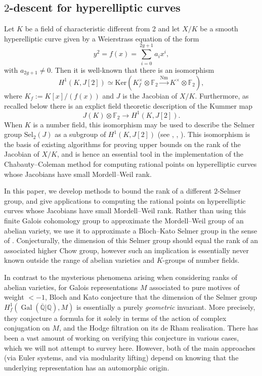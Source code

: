 \documentclass[11pt]{amsart}
\def\Q{\mathbb Q}
\def\F{\mathbb F}
\theoremstyle{plain}
\theoremstyle{definition}
\DeclareMathOperator{\Gal}{Gal}
\newcommand{\Sel}{\mathrm{Sel}}
\newcommand{\Nm}{\mathrm{Nm}}
\newcommand{\Ker}{\mathrm{Ker}}
\begin{document}
\subsection{$2$-descent for hyperelliptic curves}
Let $K$ be a field of characteristic different from 2 and let $X/K$ be a smooth hyperelliptic curve given by a Weierstrass equation of the form
\[
y^2 =f(x)=\sum _{i=0}^{2g+1}a_i x^i ,
\]
with $a_{2g+1}\neq 0$. Then it is well-known that there is an isomorphism
\[
H^1 (K,J[2]) \simeq \Ker (K_f ^\times \otimes \mathbb{F}_2 \stackrel{\Nm }{\longrightarrow }K^\times \otimes \mathbb{F}_2 ),
\] 
where $K_f :=K[x]/(f(x))$ and $J$ is the Jacobian of $X/K$. Furthermore, as recalled below there is an explict field theoretic description of the Kummer map
\[
J(K)\otimes \F _2 \to H^1 (K,J[2]).
\]
When $K$ is a number field, this isomorphism may be used to describe the Selmer group $\Sel _2 (J)$ as a subgroup of $H^1 (K,J[2])$ (see \cite{schaefer}, \cite{PS97}, \cite{stoll:implementing}). This isomorphism is the basis of existing algorithms for proving upper bounds on the rank of the Jacobian of $X/K$, and is hence an essential tool in the implementation of the Chabauty--Coleman method for computing rational points on hyperelliptic curves whose Jacobians have small Mordell--Weil rank. 

In this paper, we develop methods to bound the rank of a different $2$-Selmer group, and give applications to computing the rational points on hyperelliptic curves whose Jacobians have small Mordell--Weil rank. Rather than using this finite Galois cohomology group to approximate the Mordell--Weil group of an abelian variety, we use it to approximate a Bloch--Kato Selmer group in the sense of \cite{BK}. Conjecturally, the dimension of this Selmer group should equal the rank of an associated higher Chow group, however such an implication is essentially never known outside the range of abelian varieties and $K$-groups of number fields.

In contrast to the mysterious phenomena arising when considering ranks of abelian varieties, for Galois representations $M$ associated to pure motives of weight $<-1$, Bloch and Kato conjecture that the dimension of the Selmer group $H^1 _f (\Gal (\overline{\Q }|\Q ),M)$ is essentially a purely \textit{geometric} invariant. More precisely, they conjecture a formula for it solely in terms of the action of complex conjugation on $M$, and the Hodge filtration on its de Rham realisation. There has been a vast amount of working on verifying this conjecture in various cases, which we will not attempt to survey here. However, both of the main approaches (via Euler systems, and via modularity lifting) depend on knowing that the underlying representation has an automorphic origin.
\end{document}
